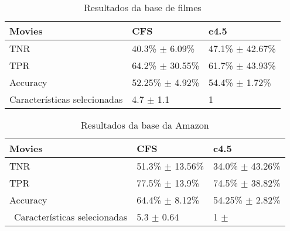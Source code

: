 \begin{table}[!h]
    \begin{tabular}{lll}
    Movies         				 				& CFS                                 	 	& c4.5                                  \\ \hline
    TNR                   						& 40.3\% $\pm$ 6.09\% 			 	& 47.1\% $\pm$ 42.67\% \\
    TPR                        					& 64.2\% $\pm$ 30.55\% 		    & 61.7\% $\pm$ 43.93\% \\
    Accuracy                   				& 52.25\% $\pm$ 4.92\% 			 & 54.4\% $\pm$ 1.72\% \\
    Características selecionadas & 4.7 $\pm$ 1.1            			 	 & 1                                     \\
    \end{tabular}
    \caption{Resultados da base de filmes}
	\label{table:movies}
\end{table}




%

\begin{table}[!h]
    \begin{tabular}{lll}
    Movies         										& CFS                          		& c4.5                                  \\ \hline
    TNR                     								& 51.3\% $\pm$ 13.56\% 	& 34.0\% $\pm$ 43.26\%  \\
    TPR                          						& 77.5\% $\pm$ 13.9\% 		& 74.5\% $\pm$ 38.82\% \\
    Accuracy                     					& 64.4\% $\pm$ 8.12\% 		& 54.25\% $\pm$ 2.82\% \\\
    Características selecionadas 		& 5.3 $\pm$ 0.64               & 1 $\pm$                                  \\
    \end{tabular}
    \caption{Resultados da base da Amazon}
	\label{table:amazon}
\end{table}

